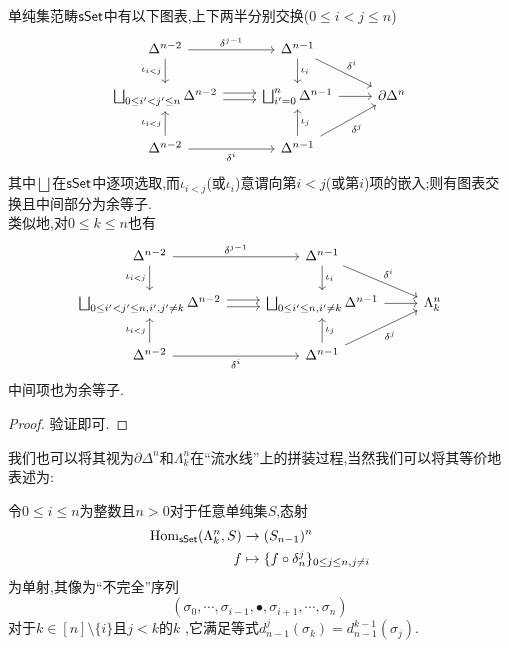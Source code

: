 \begin{proposition}\label{Pro:边界与尖角图表}
    单纯集范畴$\mathsf{sSet}$中有以下图表,上下两半分别交换($0\leq i < j \leq n$)
    \[\begin{tikzcd}
	{\Delta^{n-2}} & {\Delta^{n-1}} \\
	{\bigsqcup_{0\leq i' < j' \leq n}\Delta^{n-2}} & {\bigsqcup_{i'=0}^n\Delta^{n-1}} & {\partial\Delta^n} \\
	{\Delta^{n-2}} & {\Delta^{n-1}}
	\arrow["{\delta^{j-1}}", from=1-1, to=1-2]
	\arrow["{\iota_{i<j}}"', from=1-1, to=2-1]
	\arrow["{\iota_i}", from=1-2, to=2-2]
	\arrow["{\delta^i}", from=1-2, to=2-3]
	\arrow[shift left, from=2-1, to=2-2]
	\arrow[shift right, from=2-1, to=2-2]
	\arrow[from=2-2, to=2-3]
	\arrow["{\iota_{i<j}}", from=3-1, to=2-1]
	\arrow["{\delta^i}"', from=3-1, to=3-2]
	\arrow["{\iota_j}"', from=3-2, to=2-2]
	\arrow["{\delta^j}"', from=3-2, to=2-3]
    \end{tikzcd}\]
    其中$\bigsqcup$在$\mathsf{sSet}$中逐项选取,而$\iota_{i<j}$(或$\iota_i$)意谓向第$i<j$(或第$i$)项的嵌入;则有图表交换且中间部分为余等子.\\
    类似地,对$0\leq k \leq n$也有
    \[\begin{tikzcd}
	{\Delta^{n-2}} & {\Delta^{n-1}} \\
	{\bigsqcup_{0\leq i' < j' \leq n,i',j'\neq k}\Delta^{n-2}} & {\bigsqcup_{0\leq i'\leq n,i'\neq k}\Delta^{n-1}} & {\Lambda_k^n} \\
	{\Delta^{n-2}} & {\Delta^{n-1}}
	\arrow["{\delta^{j-1}}", from=1-1, to=1-2]
	\arrow["{\iota_{i<j}}"', from=1-1, to=2-1]
	\arrow["{\iota_i}", from=1-2, to=2-2]
	\arrow["{\delta^i}", from=1-2, to=2-3]
	\arrow[shift left, from=2-1, to=2-2]
	\arrow[shift right, from=2-1, to=2-2]
	\arrow[from=2-2, to=2-3]
	\arrow["{\iota_{i<j}}", from=3-1, to=2-1]
	\arrow["{\delta^i}"', from=3-1, to=3-2]
	\arrow["{\iota_j}"', from=3-2, to=2-2]
	\arrow["{\delta^j}"', from=3-2, to=2-3]
    \end{tikzcd}\]
    中间项也为余等子.
\end{proposition}
\begin{proof}
    验证即可.
\end{proof}
我们也可以将其视为$\partial \Delta^n$和$\Lambda_k^n$在``流水线''上的拼装过程,当然我们可以将其等价地表述为:
\begin{corollary}\label{推论:尖角变体}
    令$0 \leq i \leq n$为整数且$n >0$对于任意单纯集$S$,态射
    \begin{align*}
        \operatorname{Hom}_{\mathsf{sSet}}(\Lambda_k^n , S) &\to (S_{n-1})^n\\
        f &\mapsto \{f\circ \delta_n^j\}_{0\leq j \leq n,j \neq i}
    \end{align*}
    为单射,其像为``不完全''序列
    \[
        (\sigma_0,\cdots,\sigma_{i-1},\bullet,\sigma_{i+1},\cdots,\sigma_n)
    \]
    对于$k\in [n] \setminus \{i\}$且$j <k$的$k$ ,它满足等式$d_{n-1}^j(\sigma_k) = d_{n-1}^{k-1}(\sigma_j)$.
\end{corollary}
